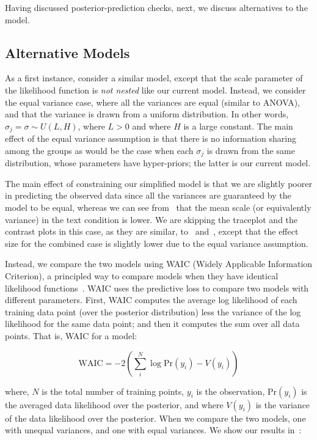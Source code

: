 Having discussed posterior-prediction checks, next, we discuss alternatives to the model.


\subsection{Alternative Models}
\label{sub:Alternative Models}

As a first instance, consider a similar model, except that the scale parameter of the likelihood function is \textit{not nested} like our current model. Instead, we consider the equal variance case, where all the variances are equal (similar to ANOVA), and that the variance is drawn from a uniform distribution. In other words, $\sigma_j = \sigma \sim U(L, H)$, where $L>0$ and where $H$ is a large constant. The main effect of the equal variance assumption is that there is no information sharing among the groups as would be the case when each $\sigma_j$ is drawn from the same distribution, whose parameters have hyper-priors; the latter is our current model.

The main effect of constraining our simplified model is that we are slightly poorer in predicting the observed data since all the variances are guaranteed by the model to be equal, whereas we can see from~ that the mean scale (or equivalently variance) in the text condition is lower. We are skipping the traceplot and the contrast plots in this case, as they are similar, to~ and~, except that the effect size for the combined case is slightly lower due to the equal variance assumption. 

Instead, we compare the two models using WAIC (Widely Applicable Information Criterion), a principled way to compare models when they have identical likelihood functions~\parencite{Gelman2014a}. WAIC uses the predictive loss to compare two models with different parameters. First, WAIC computes the average log likelihood of each training data point (over the posterior distribution) less the variance of the log likelihood for the same data point; and then it computes the sum over all data points. That is, WAIC for a model: 

\begin{equation*}
    \mathrm{WAIC} = -2 \left (\sum_i^N \log \mathrm{Pr}(y_i) - V(y_i) \right) 
\end{equation*}

where, $N$ is the total number of training points, $y_i$ is the observation, $\mathrm{Pr}(y_i)$ is the averaged data likelihood over the posterior, and where $V(y_i)$ is the variance of the data likelihood over the posterior. When we compare the two models, one with unequal variances, and one with equal variances. We show our results in~:

